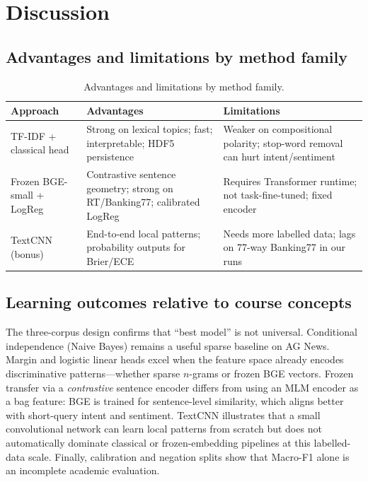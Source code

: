 \section{Discussion}

\subsection{Advantages and limitations by method family}

\begin{table}[H]
\centering
\caption{Advantages and limitations by method family.}
\small
\begin{tabular}{@{}p{3.4cm}p{5.5cm}p{5.5cm}@{}}
\toprule
Approach & Advantages & Limitations \\
\midrule
TF-IDF + classical head & Strong on lexical topics; fast; interpretable; HDF5 persistence & Weaker on compositional polarity; stop-word removal can hurt intent/sentiment \\
Frozen BGE-small + LogReg & Contrastive sentence geometry; strong on RT/Banking77; calibrated LogReg & Requires Transformer runtime; not task-fine-tuned; fixed encoder \\
TextCNN (bonus) & End-to-end local patterns; probability outputs for Brier/ECE & Needs more labelled data; lags on 77-way Banking77 in our runs \\
\bottomrule
\end{tabular}
\end{table}

\subsection{Learning outcomes relative to course concepts}

The three-corpus design confirms that ``best model'' is not universal. Conditional independence (Naive Bayes) remains a useful sparse baseline on AG News. Margin and logistic linear heads excel when the feature space already encodes discriminative patterns---whether sparse $n$-grams or frozen BGE vectors. Frozen transfer via a \emph{contrastive} sentence encoder differs from using an MLM encoder as a bag feature: BGE is trained for sentence-level similarity, which aligns better with short-query intent and sentiment. TextCNN illustrates that a small convolutional network can learn local patterns from scratch but does not automatically dominate classical or frozen-embedding pipelines at this labelled-data scale. Finally, calibration and negation splits show that Macro-F1 alone is an incomplete academic evaluation.
